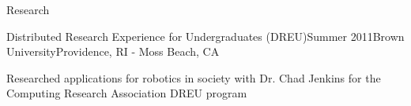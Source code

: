 \documentclass{resume} %
\begin{document}
\begin{rSection}{Research}

\begin{rSubsection}{Distributed Research Experience for Undergraduates (DREU)}{Summer 2011}{Brown University}{Providence, RI - Moss Beach, CA}
\item Researched applications for robotics in society with Dr. Chad Jenkins for the Computing Research Association DREU program
\end{rSubsection}

\end{rSection}

\end{document}
